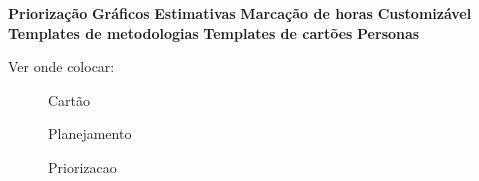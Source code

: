 \textbf{Priorização}
\textbf{Gráficos}
\textbf{Estimativas}
\textbf{Marcação de horas}
\textbf{Customizável}
\textbf{Templates de metodologias}
\textbf{Templates de cartões}
\textbf{Personas}


Ver onde colocar:

\begin{figure}[H]
  \centering
  \caption{Cartão}\label{figura:cartao}
\end{figure}

\begin{figure}[H]
  \centering
  \caption{Planejamento}\label{figura:planejamento}
\end{figure}

\begin{figure}[H]
  \centering
  \caption{Priorizacao}\label{figura:priorizacao}
\end{figure}

